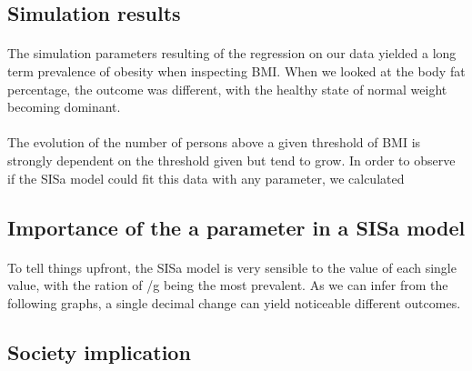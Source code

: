 \documentclass[11pt]{article}
\begin{document}
\subsection{Simulation results}
\paragraph{}
The simulation parameters resulting of the regression on our data yielded a long term prevalence of obesity when inspecting BMI. When we looked at the body fat percentage, the outcome was different, with the healthy state of normal weight becoming dominant.


\paragraph{}
The evolution of the number of persons above a given threshold of BMI is strongly dependent on the threshold given but tend to grow. In order to observe if the SISa model could fit this data with any parameter, we calculated %


\subsection{Importance of the a parameter in a SISa model}
\paragraph{}
To tell things upfront, the SISa model is very sensible to the value of each single value, with the ration of \beta  \] /g being the most prevalent. As we can infer from the following graphs, a single decimal change can yield noticeable different outcomes.



\subsection{Society implication}
\end{document}
